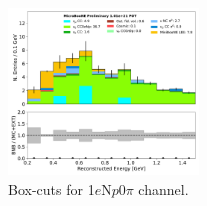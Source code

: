 \documentclass[a4paper]{article}
\newcommand{\npsel}{1$e$N$p$0$\pi$ }
\begin{document}
\begin{figure}[ht]
\begin{center}
\includegraphics[width=0.45\textwidth]{1eNp/reco_e_01162020_box_RUN1.pdf}
\caption{\label{fig:1eNp:box:RUN1}Box-cuts for \npsel channel.}
\end{center}
\end{figure}
\end{document}
